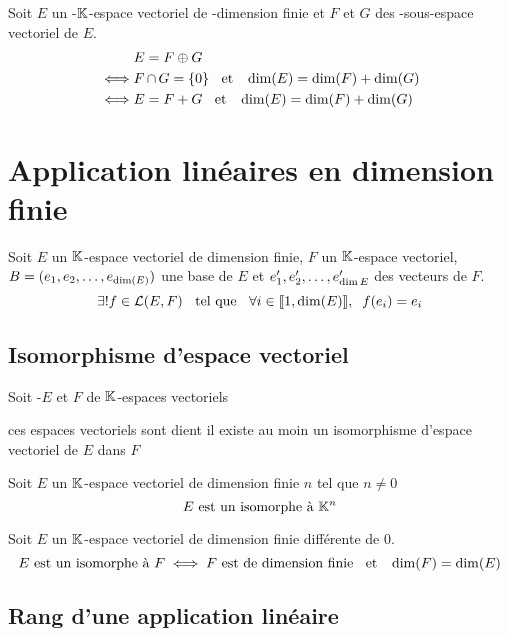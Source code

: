 \begin{prp}
Soit $E$ un \hyp{$\mathbb{K}$-espace vectoriel} de \hyp{dimension finie} et
$F$ et $G$ des \hyp{sous-espace vectoriel de $E$}.
\begin{align*}
        &E = F \oplus G \\
\iff    &F \operatorname{\cap} G = \{0\} \;\;\text{ et }\;\; \operatorname{dim}(E) = \operatorname{dim}(F) + \operatorname{dim}(G) \\
\iff    &E = F + G \;\;\text{ et }\;\; \operatorname{dim}(E) = \operatorname{dim}(F) + \operatorname{dim}(G) \\
\end{align*}
\end{prp}


\section{Application linéaires en dimension finie}

\begin{thm}
Soit $E$ un $\mathbb{K}$-espace vectoriel de dimension finie, $F$ un $\mathbb{K}$-espace
vectoriel, $B = (e_1, e_2, \ldots, e_{\operatorname{dim}(E)})$ une base de $E$ et
$e'_1, e'_2, \ldots, e'_{\operatorname{dim}{E}}$ des vecteurs de $F$.
\[
    \exists! f \in \operatorname{\mathcal{L}}(E, F) \;\;\text{ tel que }\;\; \forall i \in \llbracket 1, \operatorname{dim}(E) \rrbracket,
    \;\; f(e_i) = e_i
\]
\end{thm}


\subsection{Isomorphisme d'espace vectoriel}

\begin{dfn}
Soit \hyp{$E$ et $F$ de $\mathbb{K}$-espaces vectoriels}

ces espaces vectoriels sont dient  \ssi
il existe au moin un isomorphisme d'espace vectoriel de $E$ dans
$F$
\end{dfn}

\begin{prp}
Soit $E$ un $\mathbb{K}$-espace vectoriel de dimension finie $n$ tel que $n \neq 0$
\[
    E \text{ est un isomorphe à } \mathbb{K}^n
\]
\end{prp}

\begin{prp}
Soit $E$ un $\mathbb{K}$-espace vectoriel de dimension finie différente de $0$.
\[
    E \text{ est un isomorphe à } F \iff F \text{ est de dimension finie}
    \;\;\text{ et }\;\; \operatorname{dim}(F) = \operatorname{dim}(E)
\]
\end{prp}


\subsection{Rang d'une application linéaire}

